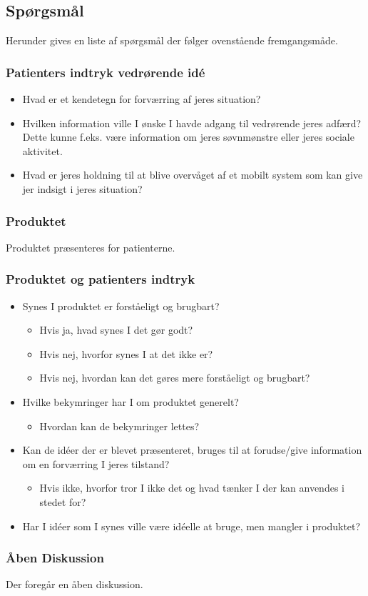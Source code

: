 \subsection*{Spørgsmål}
Herunder gives en liste af spørgsmål der følger ovenstående fremgangsmåde.

\subsubsection{Patienters indtryk vedrørende idé}
\begin{itemize}
\item Hvad er et kendetegn for forværring af jeres situation?
\item Hvilken information ville I ønske I havde adgang til vedrørende jeres adfærd? Dette kunne f.eks. være information om jeres søvnmønstre eller jeres sociale aktivitet.
\item Hvad er jeres holdning til at blive overvåget af et mobilt system som kan give jer indsigt i jeres situation?
\end{itemize}

\subsubsection*{Produktet}
Produktet præsenteres for patienterne.

\subsubsection*{Produktet og patienters indtryk}
\begin{itemize}
\item Synes I produktet er forståeligt og brugbart?
	{\begin{itemize}
	\item Hvis ja, hvad synes I det gør godt?
	\item Hvis nej, hvorfor synes I at det ikke er?
	\item Hvis nej, hvordan kan det gøres mere forståeligt og brugbart?
	\end{itemize}}
\item Hvilke bekymringer har I om produktet generelt?
	{\begin{itemize}
	\item Hvordan kan de bekymringer lettes?
	\end{itemize}}
\item Kan de idéer der er blevet præsenteret, bruges til at forudse/give information om en forværring I jeres tilstand? 
	{\begin{itemize}
	\item Hvis ikke, hvorfor tror I ikke det og hvad tænker I der kan anvendes i stedet for?
	\end{itemize}}
\item Har I idéer som I synes ville være idéelle at bruge, men mangler i produktet?
\end{itemize}

\subsubsection*{Åben Diskussion}
Der foregår en åben diskussion.
